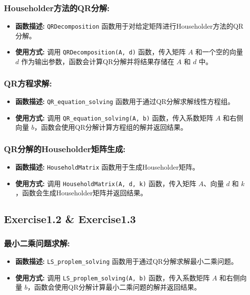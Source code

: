 \documentclass{article}
\begin{document}
\subsubsection*{Householder方法的QR分解:}
\begin{itemize}
	\item \textbf{函数描述:} \texttt{QRDecomposition} 函数用于对给定矩阵进行Householder方法的QR分解。
	\item \textbf{使用方式:} 调用 \texttt{QRDecomposition(A, d)} 函数，传入矩阵 $A$ 和一个空的向量 $d$ 作为输出参数，函数会计算QR分解并将结果存储在 $A$ 和 $d$ 中。
\end{itemize}

\subsubsection*{QR方程求解:}
\begin{itemize}
	\item \textbf{函数描述:} \texttt{QR\_equation\_solving} 函数用于通过QR分解求解线性方程组。
	\item \textbf{使用方式:} 调用 \texttt{QR\_equation\_solving(A, b)} 函数，传入系数矩阵 $A$ 和右侧向量 $b$，函数会使用QR分解计算方程组的解并返回结果。
\end{itemize}

\subsubsection*{QR分解的Householder矩阵生成:}
\begin{itemize}
	\item \textbf{函数描述:} \texttt{HouseholdMatrix} 函数用于生成Householder矩阵。
	\item \textbf{使用方式:} 调用 \texttt{HouseholdMatrix(A, d, k)} 函数，传入矩阵 $A$、向量 $d$ 和 $k$，函数会生成Householder矩阵并返回结果。
\end{itemize}

\subsection*{Exercise1.2 \& Exercise1.3}
\subsubsection*{最小二乘问题求解:}
\begin{itemize}
	\item \textbf{函数描述:} \texttt{LS\_proplem\_solving} 函数用于通过QR分解求解最小二乘问题。
	\item \textbf{使用方式:} 调用 \texttt{LS\_proplem\_solving(A, b)} 函数，传入系数矩阵 $A$ 和右侧向量 $b$，函数会使用QR分解计算最小二乘问题的解并返回结果。
\end{itemize}
\end{document}
